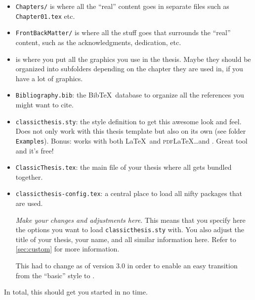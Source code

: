 \begin{itemize}
    \item\texttt{Chapters/} is where all the ``real'' content goes in
    separate files such as \texttt{Chapter01.tex} etc.
    \item\texttt{FrontBackMatter/} is where all the stuff goes that
    surrounds the ``real'' content, such as the acknowledgments,
    dedication, etc.
    \item\texttt{} is where you put all the graphics you use in
    the thesis. Maybe they should be organized into subfolders
    depending on the chapter they are used in, if you have a lot of
    graphics.
    \item\texttt{Bibliography.bib}: the Bib\TeX\ database to organize
    all the references you might want to cite.
    \item\texttt{classicthesis.sty}: the style definition to get this
    awesome look and feel. Does not only work with this thesis template
    but also on its own (see folder \texttt{Examples}). Bonus: works
    with both \LaTeX\ and \textsc{pdf}\LaTeX\dots and \mLyX.
    Great tool and it's free!
    \item\texttt{ClassicThesis.tex}: the main file of your thesis
    where all gets bundled together.
    \item\texttt{classicthesis-config.tex}: a central place to load all
    nifty packages that are used. %

    \emph{Make your changes and adjustments here.} This means that you
    specify here the options you want to load \texttt{classicthesis.sty}
    with. You also adjust the title of your thesis, your name, and all
    similar information here. Refer to \autoref{sec:custom} for more
    information.

    This had to change as of version 3.0 in order to enable an easy
    transition from the ``basic'' style to \mLyX.
\end{itemize}
In total, this should get you started in no time.


